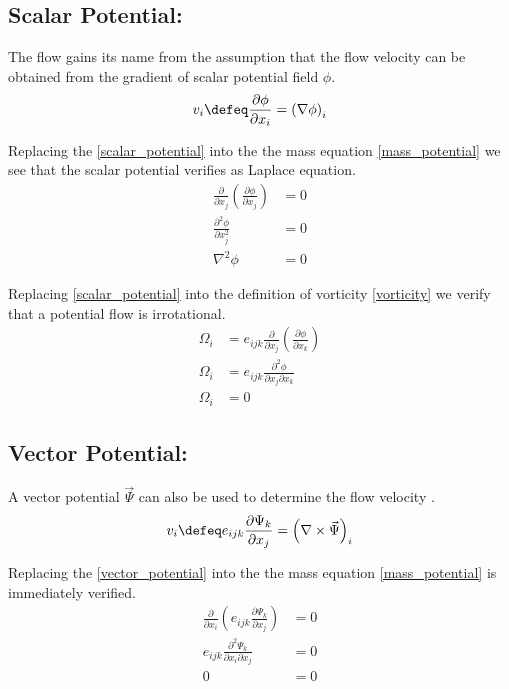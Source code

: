 \subsection*{Scalar Potential:}
The flow gains its name from the assumption that the flow velocity can be obtained from the gradient of scalar potential field $\phi$.
\begin{align}
    \label{scalar_potential}
    v_i \defeq  \frac{\partial \phi}{\partial x_i} = \left( \nabla \phi \right)_i
\end{align}

Replacing the \eqref{scalar_potential} into the the mass equation \eqref{mass_potential} we see that the scalar potential verifies as Laplace equation.
\begin{align}
    \frac{\partial}{\partial x_j} \left( \frac{\partial \phi}{\partial x_j} \right) &= 0 \nonumber  \\
    \frac{\partial^2 \phi}{\partial x_j^2} &= 0 \nonumber  \\
    \nabla^2 \phi &= 0
\end{align}

Replacing \eqref{scalar_potential} into the definition of vorticity \eqref{vorticity} we verify that a potential flow is irrotational.
\begin{align}
    \Omega_i &= e_{ijk}\frac{\partial}{\partial x_j} \left( \frac{\partial \phi}{\partial x_k} \right) \nonumber  \\
    \Omega_i &= e_{ijk}\frac{\partial^2 \phi}{\partial x_j \partial x_k} \nonumber \\ 
    \Omega_i &= 0  
\end{align}


\subsection*{Vector Potential:}
A vector potential $\vec{\Psi}$ can also be used to determine the flow velocity .
\begin{align}
    \label{vector_potential}
    v_i \defeq  e_{ijk} \frac{\partial \Psi_k}{\partial x_j} =  \left( \nabla \times \vec{\Psi} \right)_i
\end{align}

Replacing the \eqref{vector_potential} into the the mass equation \eqref{mass_potential} is immediately verified.
\begin{align*}
    \frac{\partial}{\partial x_i} \left( e_{ijk} \frac{\partial \Psi_k}{\partial x_j}  \right) &= 0 \nonumber  \\
    e_{ijk} \frac{\partial^2 \Psi_k}{\partial x_i \partial x_j}  &= 0 \nonumber  \\
    0 &= 0
\end{align*}

